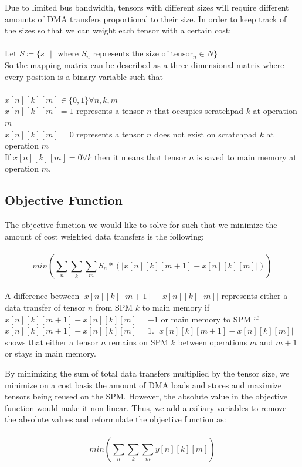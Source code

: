 Due to limited bus bandwidth, tensors with different sizes will require
different amounts of DMA transfers proportional to their size. In order to keep
track of the sizes so that we can weight each tensor with a certain cost:\\
\\
Let $S \coloneqq \{ s \text{ }| \text{ } \text{where } S_n \text{ represents the size of tensor$_n \in N$}\}$\\


So the mapping matrix can be described as a three dimensional matrix where every position is a binary variable such that\\
\\
$x[n][k][m] \in \{0, 1\} \forall n,k,m $\\
$x[n][k][m] = 1$ represents a tensor $n$ that occupies scratchpad $k$ at operation $m$ \\
$x[n][k][m] = 0$ represents a tensor $n$ does not exist on scratchpad $k$ at operation $m$\\

If $x[n][k][m] = 0 \forall k$ then it means that tensor $n$ is saved to main memory at operation $m$.


\subsection{Objective Function}
The objective function we would like to solve for such that we minimize the
amount of cost weighted data transfers is the following:\\
\\
\[
min(\sum_n \sum_k \sum_m S_n * (|x[n][k][m+1] - x[n][k][m]|))
\]
\\

A difference between $|x[n][k][m+1] - x[n][k][m]|$ represents either a data
transfer of tensor $n$ from SPM $k$ to main memory if $x[n][k][m+1] -
x[n][k][m] = -1$ or main memory to SPM if $x[n][k][m+1] - x[n][k][m] = 1$.
$|x[n][k][m+1] - x[n][k][m]|$ shows that either a tensor $n$ remains on SPM $k$
between operations $m$ and $m+1$ or stays in main memory.

By minimizing the sum of total data transfers multiplied by the tensor size, we
minimize on a cost basis the amount of DMA loads and stores and maximize
tensors being reused on the SPM. However, the absolute value in the objective function
would make it non-linear. Thus, we add auxiliary variables to remove the absolute values
and reformulate the objective function as:\\
\\
\[
min(\sum_n \sum_k \sum_m y[n][k][m])
\]

